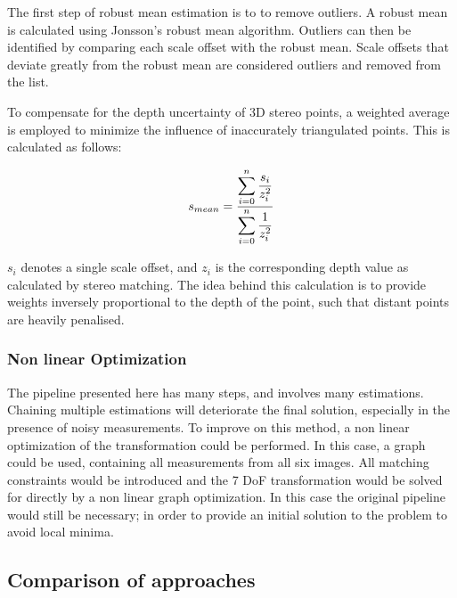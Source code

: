 The first step of robust mean estimation is to to remove outliers.  A robust mean is calculated using Jonsson's\cite{jonsson_05} robust mean algorithm.  Outliers can then be identified by comparing each scale offset with the robust mean.  Scale offsets that deviate greatly from the robust mean are considered outliers and removed from the list.

To compensate for the depth uncertainty of 3D stereo points, a weighted average is employed to minimize the influence of inaccurately triangulated points.  This is calculated as follows:

\begin{equation}
\centering
s_{mean} = \dfrac{\displaystyle\sum\limits_{i=0}^n{\dfrac{s_i}{z_i^2}}}
{\displaystyle\sum\limits_{i=0}^n{\dfrac{1}{z_i^2}}}
\end{equation}

$s_i$ denotes a single scale offset, and $z_i$ is the corresponding depth value as calculated by stereo matching.  The idea behind this calculation is to provide weights inversely proportional to the depth of the point, such that distant points are heavily penalised.  

\subsubsection{Non linear Optimization}

The pipeline presented here has many steps, and involves many estimations.  Chaining multiple estimations will deteriorate the final solution, especially in the presence of noisy measurements.  To improve on this method, a non linear optimization of the transformation could be performed.  In this case, a graph could be used, containing all measurements from all six images.  All matching constraints would be introduced and the 7 DoF transformation would be solved for directly by a non linear graph optimization.  In this case the original pipeline would still be necessary; in order to provide an initial solution to the problem to avoid local minima.

\subsection{Comparison of approaches}

